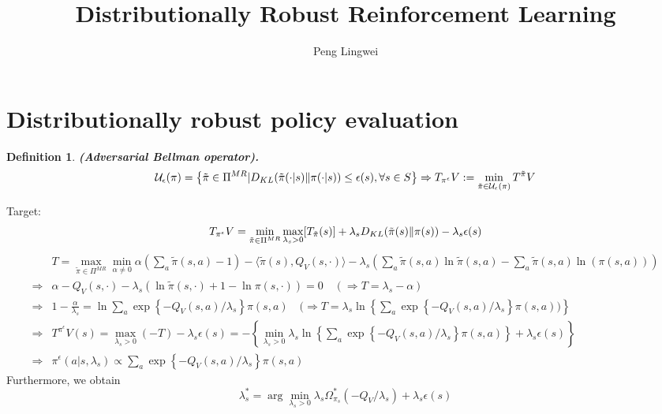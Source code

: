 \documentclass[a4paper]{article}
\title{Distributionally Robust Reinforcement Learning}
\author{Peng Lingwei}
\newtheorem{definition}{Definition}
\begin{document}
\maketitle
\tableofcontents
\newpage

\section{Distributionally robust policy evaluation}%
\label{sec:distributionally_robust_policy_evaluation}

\begin{definition}
    \textbf{(Adversarial Bellman operator).}
    \[
        \mathcal{U}_{\epsilon}(\pi) = \left\{ \tilde \pi \in \Pi^{MR} | D_{KL}(\tilde \pi(\cdot | s) \Arrowvert \pi(\cdot | s)) \le \epsilon(s), \forall s \in S \right\}
        \Rightarrow T_{\pi^{\epsilon}} V := \min_{\tilde \pi \in \mathcal{U}_{\epsilon}(\pi)} T^{\tilde \pi} V 
    \]
\end{definition}

Target:
\[
    T_{\pi^{\epsilon}}V = \min_{\tilde\pi \in \Pi^{MR}}\max_{\lambda_s > 0} [T_{\tilde \pi}(s)]
    + \lambda_s D_{KL}(\tilde \pi(s) \Arrowvert \pi(s)) - \lambda_s \epsilon(s)
\]
\begin{align*}
    &T = \max_{\tilde \pi \in \Pi^{MR}} \min_{\alpha \ne 0} \alpha( \sum^{}_{a} \tilde \pi(s, a) - 1) 
    - \langle \tilde\pi(s), Q_{V}(s, \cdot) \rangle 
    - \lambda_s \left( \sum^{}_{a} \tilde \pi(s, a) \ln \tilde \pi(s, a) - \sum^{}_{a} \tilde \pi(s,a) \ln(\pi(s,a)) \right) \\
    \Rightarrow& \alpha - Q_{V}(s, \cdot) - \lambda_s \left( \ln \tilde \pi(s,\cdot) + 1 - \ln\pi(s,\cdot) \right) = 0
    \quad (\Rightarrow T = \lambda_s - \alpha)\\
    \Rightarrow& 1 - \frac{\alpha}{\lambda_s} = \ln \sum^{}_{a} \exp\left\{ -Q_V(s,a)/\lambda_s \right\} \pi(s,a)
    \quad (\Rightarrow T = \lambda_s \ln \left\{\sum^{}_{a} \exp\left\{ -Q_V(s,a)/\lambda_s \right\} \pi(s,a))\right\}\\
    \Rightarrow& T^{\pi^{\epsilon}}V(s) = \max_{\lambda_s > 0} (-T) - \lambda_s \epsilon(s) = -\left\{\min_{\lambda_s > 0}\lambda_s \ln \left\{\sum^{}_{a} \exp\left\{ -Q_V(s,a)/\lambda_s \right\} \pi(s,a)\right\}+\lambda_s \epsilon(s)\right\}\\
    \Rightarrow&\pi^{\epsilon}(a | s, \lambda_s) \propto\sum^{}_{a} \exp\left\{ -Q_V(s,a)/\lambda_s \right\} \pi(s,a)
\end{align*}
Furthermore, we obtain
\[
    \lambda^*_s = \arg\min_{\lambda_s > 0} \lambda_s \Omega_{\pi_{s}}^*\left( -Q_V/\lambda_s \right)+\lambda_s \epsilon(s)
\]
\end{document}

